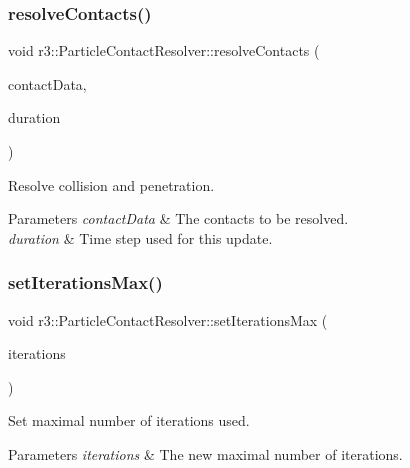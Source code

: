 \subsubsection{\texorpdfstring{resolve\+Contacts()}{resolveContacts()}}
{\footnotesize\ttfamily void r3\+::\+Particle\+Contact\+Resolver\+::resolve\+Contacts (\begin{DoxyParamCaption}\item[{\mbox{\hyperlink{classr3_1_1_fixed_size_container}{Fixed\+Size\+Container}}$<$ \mbox{\hyperlink{classr3_1_1_particle_contact}{Particle\+Contact}} $>$ \&}]{contact\+Data,  }\item[{\mbox{\hyperlink{namespacer3_ab2016b3e3f743fb735afce242f0dc1eb}{real}}}]{duration }\end{DoxyParamCaption})}



Resolve collision and penetration. 


\begin{DoxyParams}{Parameters}
{\em contact\+Data} & The contacts to be resolved. \\
\hline
{\em duration} & Time step used for this update. \\
\hline
\end{DoxyParams}
\mbox{\label{classr3_1_1_particle_contact_resolver_a631df60543a1709a7c48dcf56490b3d2}} 
\subsubsection{\texorpdfstring{set\+Iterations\+Max()}{setIterationsMax()}}
{\footnotesize\ttfamily void r3\+::\+Particle\+Contact\+Resolver\+::set\+Iterations\+Max (\begin{DoxyParamCaption}\item[{unsigned int}]{iterations }\end{DoxyParamCaption})}



Set maximal number of iterations used. 


\begin{DoxyParams}{Parameters}
{\em iterations} & The new maximal number of iterations. \\
\hline
\end{DoxyParams}


